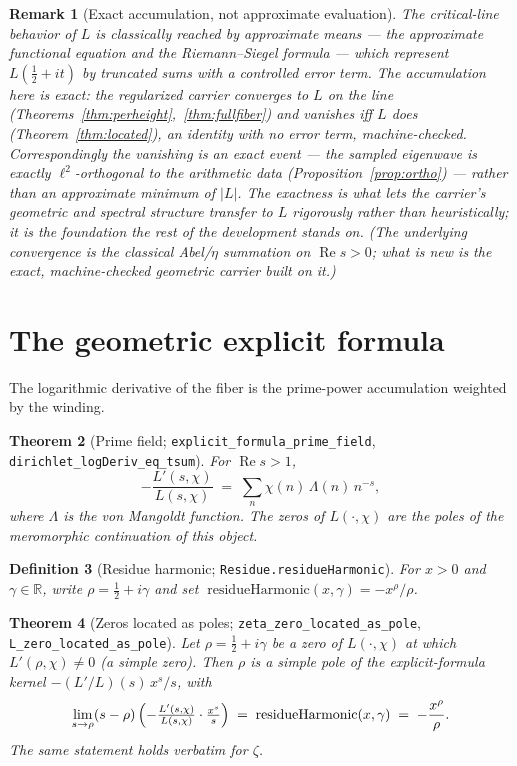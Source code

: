 \documentclass[11pt]{article}
\newtheorem{definition}{Definition}[section]
\newtheorem{theorem}[definition]{Theorem}
\newtheorem{remark}[definition]{Remark}
\DeclareMathOperator{\Ree}{Re}
\newcommand{\R}{\mathbb{R}}
\newcommand{\code}[1]{\texttt{#1}}
\begin{document}
\begin{remark}[Exact accumulation, not approximate evaluation]\label{rem:exactvsapprox}
The critical-line behavior of $L$ is classically reached by \emph{approximate} means --- the approximate
functional equation and the Riemann--Siegel formula --- which represent $L(\tfrac12+it)$ by truncated
sums with a controlled error term. The accumulation here is \emph{exact}: the regularized carrier
converges to $L$ on the line (Theorems~\ref{thm:perheight},~\ref{thm:fullfiber}) and vanishes \emph{iff}
$L$ does (Theorem~\ref{thm:located}), an identity with no error term, machine-checked. Correspondingly the
vanishing is an exact \emph{event} --- the sampled eigenwave is exactly $\ell^2$-orthogonal to the
arithmetic data (Proposition~\ref{prop:ortho}) --- rather than an approximate minimum of $|L|$. The
exactness is what lets the carrier's geometric and spectral structure transfer to $L$ rigorously rather
than heuristically; it is the foundation the rest of the development stands on. (The underlying
convergence is the classical Abel/$\eta$ summation on $\Ree s>0$; what is new is the exact, machine-checked
geometric carrier built on it.)
\end{remark}

\section{The geometric explicit formula}\label{sec:explicit}

The logarithmic derivative of the fiber is the prime-power accumulation weighted by the winding.

\begin{theorem}[Prime field; \code{explicit\_formula\_prime\_field}, \code{dirichlet\_logDeriv\_eq\_tsum}]\label{thm:primefield}
For $\Ree s>1$,
\[
  -\frac{L'(s,\chi)}{L(s,\chi)} \;=\; \sum_{n}\chi(n)\,\Lambda(n)\,n^{-s},
\]
where $\Lambda$ is the von Mangoldt function. The zeros of $L(\cdot,\chi)$ are the poles of the
meromorphic continuation of this object.
\end{theorem}

\begin{definition}[Residue harmonic; \code{Residue.residueHarmonic}]\label{def:resharm}
For $x>0$ and $\gamma\in\R$, write $\rho=\tfrac12+i\gamma$ and set
$\;\mathrm{residueHarmonic}(x,\gamma)=-x^{\rho}/\rho$.
\end{definition}

\begin{theorem}[Zeros located as poles; \code{zeta\_zero\_located\_as\_pole}, \code{L\_zero\_located\_as\_pole}]\label{thm:pole}
Let $\rho=\tfrac12+i\gamma$ be a zero of $L(\cdot,\chi)$ at which $L'(\rho,\chi)\neq 0$ (a simple
zero). Then $\rho$ is a simple pole of the explicit-formula kernel $-(L'/L)(s)\,x^{s}/s$, with
\[
  \lim_{s\to\rho}(s-\rho)\,\Bigl(-\tfrac{L'(s,\chi)}{L(s,\chi)}\cdot\tfrac{x^{s}}{s}\Bigr)
   \;=\; \mathrm{residueHarmonic}(x,\gamma)\;=\;-\frac{x^{\rho}}{\rho}.
\]
The same statement holds verbatim for $\zeta$.
\end{theorem}
\end{document}
